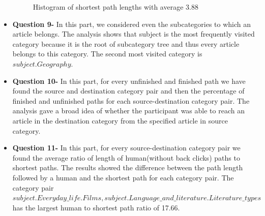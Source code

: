 \documentclass{article}
\begin{document}
\begin{itemize}
\begin{figure}[h]
\caption{Histogram of shortest path lengths with average 3.88}
\label{fig}
\end{figure}
\newpage
\item \textbf{Question 9- }In this part, we considered even the subcategories to which an article belongs. The analysis shows that subject is the most frequently visited category because  it is the root of subcategory tree and thus every article belongs to this category. The second most visited category is $subject.Geography$.
\item \textbf{Question 10- }In this part, for every unfinished and finished path we have found the source and destination category pair and then the percentage of finished and unfinished paths for each source-destination category pair. The analysis gave a broad idea of whether the participant was able to reach an article in the destination category from the specified article in source category.
\item \textbf{Question 11- }In this part, for every source-destination category pair we found the average ratio of length of human(without back clicks) paths to shortest paths. The results showed the difference between the path length followed by a human and the shortest path for each category pair. The category pair $subject.Everyday\_life.Films, subject.Language\_and\_literature.Literature\_types$ has the largest human to shortest path ratio of 17.66.
\end{itemize}
\end{document}
